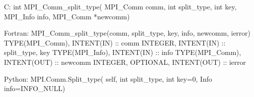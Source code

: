 C:
int MPI_Comm_split_type(
  MPI_Comm comm, int split_type, int key,
  MPI_Info info, MPI_Comm *newcomm)

Fortran:
MPI_Comm_split_type(comm, split_type, key, info, newcomm, ierror)
TYPE(MPI_Comm), INTENT(IN) :: comm
INTEGER, INTENT(IN) :: split_type, key
TYPE(MPI_Info), INTENT(IN) :: info
TYPE(MPI_Comm), INTENT(OUT) :: newcomm
INTEGER, OPTIONAL, INTENT(OUT) :: ierror 

Python:
MPI.Comm.Split_type(
  self, int split_type, int key=0, Info info=INFO_NULL)
